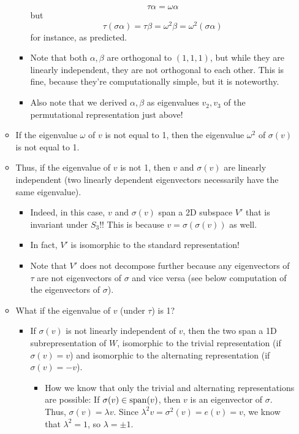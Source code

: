 \documentclass[../notes.tex]{subfiles}
\begin{document}
\begin{itemize}
\begin{itemize}
\begin{itemize}
\begin{equation*}
                \tau\alpha = \omega\alpha
            \end{equation*}
            but
            \begin{equation*}
                \tau(\sigma\alpha) = \tau\beta = \omega^2\beta = \omega^2(\sigma\alpha)
            \end{equation*}
            for instance, as predicted.
            \item Note that both $\alpha,\beta$ are orthogonal to $(1,1,1)$, but while they are linearly independent, they are not orthogonal to each other. This is fine, because they're computationally simple, but it is noteworthy.
            \item Also note that we derived $\alpha,\beta$ as eigenvalues $v_2,v_3$ of the permutational representation just above!
        \end{itemize}
        \item If the eigenvalue $\omega$ of $v$ is not equal to 1, then the eigenvalue $\omega^2$ of $\sigma(v)$ is not equal to 1.
        \item Thus, if the eigenvalue of $v$ is not 1, then $v$ and $\sigma(v)$ are linearly independent (two linearly dependent eigenvectors necessarily have the same eigenvalue).
        \begin{itemize}
            \item Indeed, in this case, $v$ and $\sigma(v)$ span a 2D subspace $V'$ that is invariant under $S_3$!! This is because $v=\sigma(\sigma(v))$ as well.
            \item In fact, $V'$ is isomorphic to the standard representation!
            \item Note that $V'$ does not decompose further because any eigenvectors of $\tau$ are not eigenvectors of $\sigma$ and vice versa (see below computation of the eigenvectors of $\sigma$).
        \end{itemize}
        \item What if the eigenvalue of $v$ (under $\tau$) is 1?
        \begin{itemize}
            \item If $\sigma(v)$ is not linearly independent of $v$, then the two span a 1D subrepresentation of $W$, isomorphic to the trivial representation (if $\sigma(v)=v$) and isomorphic to the alternating representation (if $\sigma(v)=-v$).
            \begin{itemize}
                \item How we know that only the trivial and alternating representations are possible: If $\sigma(v)\in\operatorname{span}(v)$, then $v$ is an eigenvector of $\sigma$. Thus, $\sigma(v)=\lambda v$. Since $\lambda^2v=\sigma^2(v)=e(v)=v$, we know that $\lambda^2=1$, so $\lambda=\pm 1$.

\end{itemize}
\end{itemize}
\end{itemize}
\end{itemize}
\end{document}
